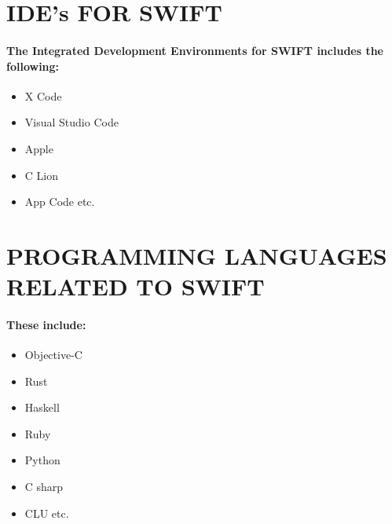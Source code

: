 \documentclass{article}
\begin{document}
\section*{IDE’s FOR SWIFT}
\paragraph{The Integrated Development Environments for SWIFT includes the following:}
\begin{itemize}
	\item X Code
	\item Visual Studio Code
	\item Apple
	\item C Lion
	\item App Code etc.
	
\end{itemize}
\newpage
\section*{PROGRAMMING LANGUAGES RELATED TO SWIFT}
\paragraph{These include:
}
\begin{itemize}
	\item Objective-C 
	\item Rust 
	\item Haskell
	\item Ruby
	\item Python 
	\item C sharp
	\item CLU etc.
\end{itemize}
\end{document}
